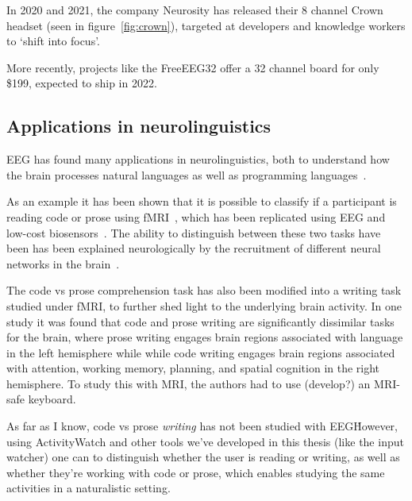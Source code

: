     In 2020 and 2021, the company Neurosity has released their 8 channel Crown headset (seen in figure~\ref{fig:crown}), targeted at developers and knowledge workers to `shift into focus'.

    More recently, projects like the FreeEEG32 offer a 32 channel board for only \$199, expected to ship in 2022.\cite{noauthor_freeeeg32_nodate}

    \subsection*{Applications in neurolinguistics}

        EEG has found many applications in neurolinguistics, both to understand how the brain processes natural languages as well as programming languages~\cite{prat_relating_2020}.

         As an example it has been shown that it is possible to classify if a participant is reading code or prose using fMRI~\cite{floyd_decoding_2017}, which has been replicated using EEG and low-cost biosensors~\cite{fucci_replication_2019}. The ability to distinguish between these two tasks have been has been explained neurologically by the recruitment of different neural networks in the brain~\cite{ivanova_comprehension_2020}.

        The code vs prose comprehension task has also been modified into a writing task studied under fMRI, to further shed light to the underlying brain activity. In one study it was found that code and prose writing are significantly dissimilar tasks for the brain, where prose writing engages brain regions associated with language in the left hemisphere while while code writing engages brain regions associated with attention, working memory, planning, and spatial cognition in the right hemisphere\cite{noauthor_neurological_nodate}. To study this with MRI, the authors had to use (develop?) an MRI-safe keyboard.

        As far as I know, code vs prose \emph{writing} has not been studied with EEG\. However, using ActivityWatch and other tools we've developed in this thesis (like the input watcher) one can to distinguish whether the user is reading or writing, as well as whether they're working with code or prose, which enables studying the same activities in a naturalistic setting.


